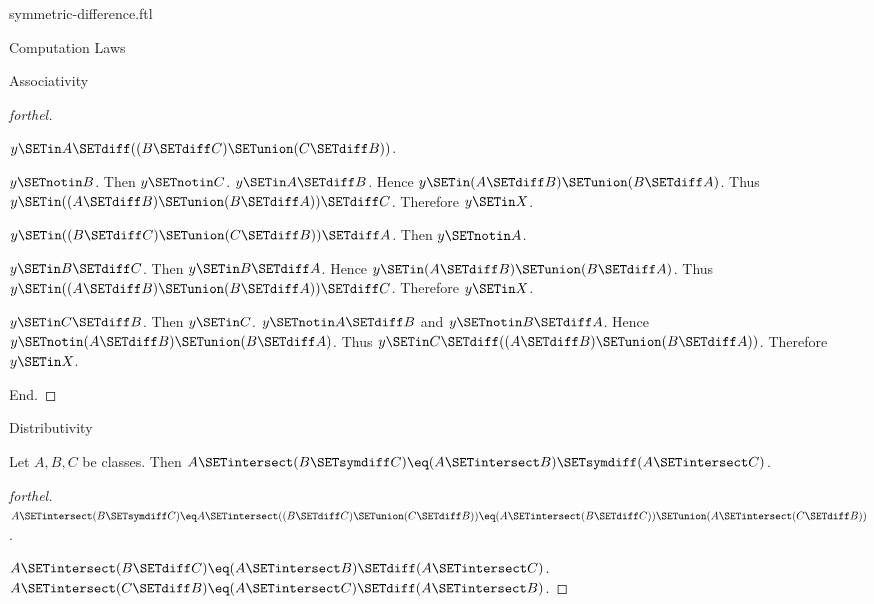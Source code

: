 \documentclass{naproche-library}
\begin{document}
\begin{smodule}[title=Symmetric Difference]{symmetric-difference.ftl}
\begin{sfragment}{Computation Laws}
\begin{sfragment}{Associativity}
\begin{proof}[forthel]
\begin{case}{$y \SETin A \SETdiff ((B \SETdiff C) \SETunion (C \SETdiff B))$.}
          \begin{case}{$y \SETnotin B$.}
            Then $y \SETnotin C$.
            $y \SETin A \SETdiff B$.
            Hence $y \SETin (A \SETdiff B) \SETunion (B \SETdiff A)$.
            Thus $y \SETin ((A \SETdiff B) \SETunion (B \SETdiff A)) \SETdiff C$.
            Therefore $y \SETin X$.
          \end{case}
        \end{case}

        \begin{case}{$y \SETin ((B \SETdiff C) \SETunion (C \SETdiff B)) \SETdiff A$.}
          Then $y \SETnotin A$.

          \begin{case}{$y \SETin B \SETdiff C$.}
            Then $y \SETin B \SETdiff A$.
            Hence $y \SETin (A \SETdiff B) \SETunion (B \SETdiff A)$.
            Thus $y \SETin ((A \SETdiff B) \SETunion (B \SETdiff A)) \SETdiff C$.
            Therefore $y \SETin X$.
          \end{case}

          \begin{case}{$y \SETin C \SETdiff B$.}
            Then $y \SETin C$.
            $y \SETnotin A \SETdiff B$ and $y \SETnotin B \SETdiff A$.
            Hence $y \SETnotin (A \SETdiff B) \SETunion (B \SETdiff A)$.
            Thus $y \SETin C \SETdiff ((A \SETdiff B) \SETunion (B \SETdiff A))$.
            Therefore $y \SETin X$.
          \end{case}
        \end{case}
      End.
    \end{proof}
  \end{sfragment}

  \begin{sfragment}{Distributivity}
    \begin{proposition}[forthel,id=FOUNDATIONS_03_4119141910839296]
      Let $A, B, C$ be classes.
      Then $A \SETintersect (B \SETsymdiff C) \eq (A \SETintersect B) \SETsymdiff (A \SETintersect C)$.
    \end{proposition}
    \begin{proof}[forthel]
      $A \SETintersect (B \SETsymdiff C)
        \eq A \SETintersect ((B \SETdiff C) \SETunion (C \SETdiff B))
        \eq (A \SETintersect (B \SETdiff C)) \SETunion (A \SETintersect (C \SETdiff B))$.

      $A \SETintersect (B \SETdiff C) \eq (A \SETintersect B) \SETdiff (A \SETintersect C)$.
      $A \SETintersect (C \SETdiff B) \eq (A \SETintersect C) \SETdiff (A \SETintersect B)$.


\end{proof}
\end{sfragment}
\end{sfragment}
\end{smodule}
\end{document}
